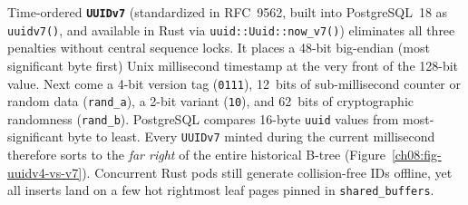 Time-ordered \textbf{\texttt{UUIDv7}} (standardized in RFC~9562, built into
PostgreSQL~18 as \texttt{uuidv7()}, and available in Rust via
\texttt{uuid::Uuid::now\_v7()}) eliminates all three penalties without central
sequence locks. It places a 48-bit big-endian (most significant byte first) Unix millisecond timestamp at
the very front of the 128-bit value. Next come a 4-bit version tag (\texttt{0111}),
12~bits of sub-millisecond counter or random data (\texttt{rand\_a}), a 2-bit
variant (\texttt{10}), and 62~bits of cryptographic randomness (\texttt{rand\_b}).
PostgreSQL compares 16-byte \texttt{uuid} values from most-significant byte to
least. Every \texttt{UUIDv7} minted during the current millisecond therefore sorts
to the \emph{far right} of the entire historical B-tree
(Figure~\ref{ch08:fig-uuidv4-vs-v7}). Concurrent Rust pods still generate
collision-free IDs offline, yet all inserts land on a few hot rightmost leaf pages
pinned in \texttt{shared\_buffers}.

